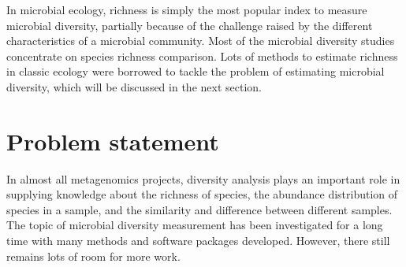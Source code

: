 In microbial ecology, richness is simply the most popular index to measure
microbial diversity, partially because of the challenge raised by the different
characteristics of a microbial community. Most of the microbial diversity studies
concentrate on species richness comparison\cite{Bohannan2003}. 
Lots of methods to estimate richness in
classic ecology were borrowed to tackle the problem of estimating microbial
diversity, which will be discussed in the next section.
\section{Problem statement}


In almost all metagenomics projects, diversity analysis plays an important
role in supplying knowledge about the richness of species, the 
abundance distribution of species in a sample, and the similarity and difference between
different samples. The topic of microbial diversity measurement has been
investigated for a long time with many methods and software packages developed.
However, there still remains lots of room for more work.


